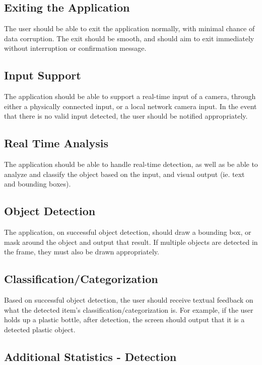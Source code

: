 \documentclass[conference]{IEEEtran}
\begin{document}
\subsection{Exiting the Application}
The user should be able to exit the application normally, with minimal chance of data corruption. The exit should be smooth, and should aim to exit immediately without interruption or confirmation message.
\newline
\subsection{Input Support}

The application should be able to support a real-time input of a camera, through either a physically connected input, or a local network camera input. In the event that there is no valid input detected, the user should be notified appropriately.
\newline
\subsection{Real Time Analysis}

The application should be able to handle real-time detection, as well as be able to analyze and classify the object based on the input, and  visual output (ie. text and bounding boxes). 
\newline
\subsection{Object Detection}

The application, on successful object detection, should draw a bounding box, or mask around the object and output that result. If multiple objects are detected in the frame, they must also be drawn appropriately.
\newline
\subsection{Classification/Categorization}

Based on successful object detection, the user should receive textual feedback on what the detected item's classification/categorization is. For example, if the user holds up a plastic bottle, after detection, the screen should output that it is a detected plastic object.
\newline
\subsection{Additional Statistics - Detection}
\end{document}
